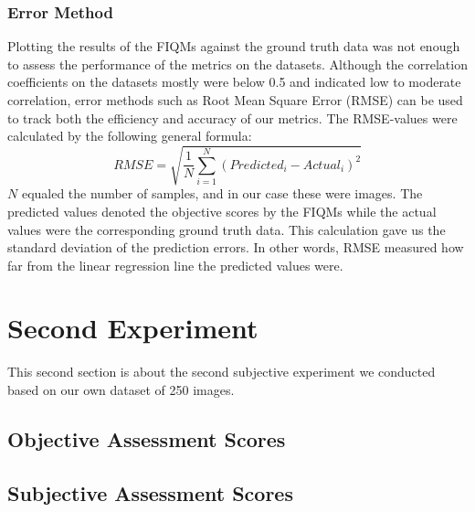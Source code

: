 \subsubsection{Error Method}
Plotting the results of the FIQMs against the ground truth data was not enough to assess the performance of the metrics on the datasets. Although the correlation coefficients on the datasets mostly were below 0.5 and indicated low to moderate correlation, error methods such as Root Mean Square Error (RMSE) can be used to track both the efficiency and accuracy of our metrics. The RMSE-values were calculated by the following general formula: 
\begin{equation}
    RMSE = \sqrt{\frac{1}{N}\sum _{i=1}^{N}(Predicted_{i} - Actual_{i})^2}
\end{equation}
$N$ equaled the number of samples, and in our case these were images. The predicted values denoted the objective scores by the FIQMs while the actual values were the corresponding ground truth data. This calculation gave us the standard deviation of the prediction errors. In other words, RMSE measured how far from the linear regression line the predicted values were. 
\newpage

\begin{table}[h]
\caption{The calculated RMSE values of the FIQMs on the datasets relative to the ground truth data. The RMSE value was not calculated for the Selfie dataset with the combined scores of the FIQMs. The `X' symbolises this.}
\end{table}



\section{Second Experiment}
This second section is about the second subjective experiment we conducted based on our own dataset of 250 images. 
\subsection{Objective Assessment Scores}
\subsection{Subjective Assessment Scores}